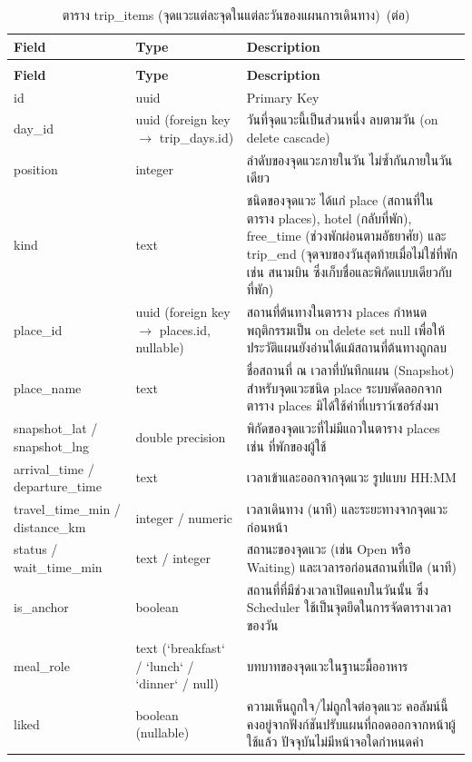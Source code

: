 \begin{longtable}{|p{3.6cm}|p{2.6cm}|p{6.8cm}|}
\caption{ตาราง trip\_items (จุดแวะแต่ละจุดในแต่ละวันของแผนการเดินทาง)}\label{tab:db_tripitems}\\
\hline
\textbf{Field} & \textbf{Type} & \textbf{Description} \\
\hline
\endfirsthead
\caption[]{ตาราง trip\_items (จุดแวะแต่ละจุดในแต่ละวันของแผนการเดินทาง)~(\textnormal{ต่อ})}\\
\hline
\textbf{Field} & \textbf{Type} & \textbf{Description} \\
\hline
\endhead
id & uuid & Primary Key \\ \hline
day\_id & uuid (foreign key $\to$ trip\_days.id) & วันที่จุดแวะนี้เป็นส่วนหนึ่ง ลบตามวัน (on delete cascade) \\ \hline
position & integer & ลำดับของจุดแวะภายในวัน ไม่ซ้ำกันภายในวันเดียว \\ \hline
kind & text & ชนิดของจุดแวะ ได้แก่ place (สถานที่ในตาราง places), hotel (กลับที่พัก), free\_time (ช่วงพักผ่อนตามอัธยาศัย) และ trip\_end (จุดจบของวันสุดท้ายเมื่อไม่ใช่ที่พัก เช่น สนามบิน ซึ่งเก็บชื่อและพิกัดแบบเดียวกับที่พัก) \\ \hline
place\_id & uuid (foreign key $\to$ places.id, nullable) & สถานที่ต้นทางในตาราง places กำหนดพฤติกรรมเป็น on delete set null เพื่อให้ประวัติแผนยังอ่านได้แม้สถานที่ต้นทางถูกลบ \\ \hline
place\_name & text & ชื่อสถานที่ ณ เวลาที่บันทึกแผน (Snapshot) สำหรับจุดแวะชนิด place ระบบคัดลอกจากตาราง places มิได้ใช้ค่าที่เบราว์เซอร์ส่งมา \\ \hline
snapshot\_lat / snapshot\_lng & double precision & พิกัดของจุดแวะที่ไม่มีแถวในตาราง places เช่น ที่พักของผู้ใช้ \\ \hline
arrival\_time / departure\_time & text & เวลาเข้าและออกจากจุดแวะ รูปแบบ HH:MM \\ \hline
travel\_time\_min / distance\_km & integer / numeric & เวลาเดินทาง (นาที) และระยะทางจากจุดแวะก่อนหน้า \\ \hline
status / wait\_time\_min & text / integer & สถานะของจุดแวะ (เช่น Open หรือ Waiting) และเวลารอก่อนสถานที่เปิด (นาที) \\ \hline
is\_anchor & boolean & สถานที่ที่มีช่วงเวลาเปิดแคบในวันนั้น ซึ่ง Scheduler ใช้เป็นจุดยึดในการจัดตารางเวลาของวัน \\ \hline
meal\_role & text (`breakfast` / `lunch` / `dinner` / null) & บทบาทของจุดแวะในฐานะมื้ออาหาร \\ \hline
liked & boolean (nullable) & ความเห็นถูกใจ/ไม่ถูกใจต่อจุดแวะ คอลัมน์นี้คงอยู่จากฟังก์ชันปรับแผนที่ถอดออกจากหน้าผู้ใช้แล้ว ปัจจุบันไม่มีหน้าจอใดกำหนดค่า \\
\hline
\end{longtable}


